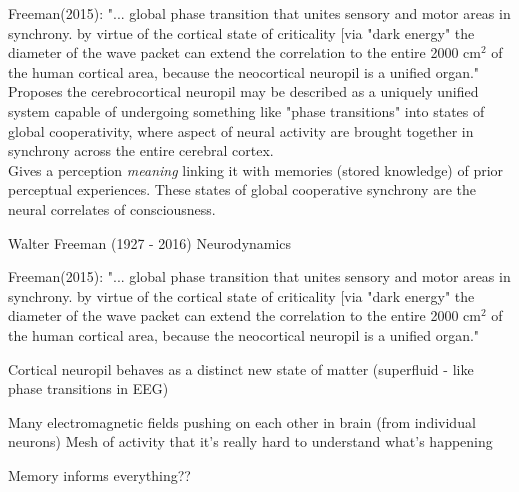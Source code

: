 \documentclass{article}
\begin{document}
Freeman(2015): "... global phase transition that unites sensory and motor areas in synchrony. by virtue of the cortical state of criticality [via "dark energy" the diameter of the wave packet can extend the correlation to the entire 2000 cm$^2$ of the human cortical area, because the neocortical neuropil is a unified organ." \\

Proposes the cerebrocortical neuropil may be described as a uniquely unified system capable of undergoing something like "phase transitions" into states of global cooperativity, where aspect of neural activity are brought together in synchrony across the entire cerebral cortex. \\

Gives a perception \textit{meaning} linking it with memories (stored knowledge) of prior perceptual experiences. These states of global cooperative synchrony are the neural correlates of consciousness. 

\newpage

Walter Freeman (1927 - 2016) 
Neurodynamics

Freeman(2015): "... global phase transition that unites sensory and motor areas in synchrony. by virtue of the cortical state of criticality [via "dark energy" the diameter of the wave packet can extend the correlation to the entire 2000 cm$^2$ of the human cortical area, because the neocortical neuropil is a unified organ."

Cortical neuropil behaves as a distinct new state of matter (superfluid - like phase transitions in EEG) 

Many electromagnetic fields pushing on each other in brain (from individual neurons) 
Mesh of activity that it's really hard to understand what's happening

Memory informs everything?? 
\end{document}
